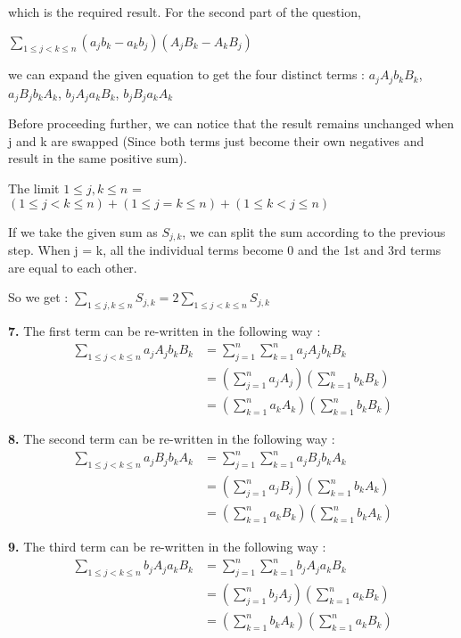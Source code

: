 \documentclass[12pt]{article}
\begin{document}
which is the required result. For the second part of the question, 

$\sum\limits_{1 \leq j < k \leq n}^{} {(a_jb_k - a_kb_j)(A_jB_k - A_kB_j)}$

we can expand the given equation to get the four distinct terms : $a_jA_jb_kB_k$, $a_jB_jb_kA_k$, $b_jA_ja_kB_k$, $b_jB_ja_kA_k$

Before proceeding further, we can notice that the result remains unchanged when j and k are swapped (Since both terms just become their own negatives and result in the same positive sum).

The limit $1 \leq j , k \leq n$ = $(1 \leq j < k \leq n) + (1 \leq j = k \leq n) + (1 \leq k < j \leq n)$

If we take the given sum as $S_{j,k}$, we can split the sum according to the previous step. When j = k, all the individual terms become 0 and the 1st and 3rd terms are equal to each other.

So we get : $\sum\limits_{1 \leq j,k \leq n}^{} S_{j,k} = 2 \sum\limits_{1 \leq j < k \leq n}^{} S_{j,k}$

{\bf 7. }The first term can be re-written in the following way :
\begin{equation}\label{eq2}
  \begin{split}
     \sum\limits_{1 \leq j < k \leq n}^{} a_jA_jb_kB_k & = \sum\limits_{j=1}^{n}\sum\limits_{k=1}^{n} {a_jA_jb_kB_k} \\
     & = (\sum\limits_{j=1}^{n}{a_jA_j}) (\sum\limits_{k=1}^{n} {b_kB_k})\\
     & = (\sum\limits_{k=1}^{n}{a_kA_k}) (\sum\limits_{k=1}^{n} {b_kB_k})
  \end{split}
\end{equation}

{\bf 8. }The second term can be re-written in the following way :
\begin{equation}\label{eq2}
  \begin{split}
     \sum\limits_{1 \leq j < k \leq n}^{} a_jB_jb_kA_k & = \sum\limits_{j=1}^{n}\sum\limits_{k=1}^{n} {a_jB_jb_kA_k} \\
     & = (\sum\limits_{j=1}^{n}{a_jB_j}) (\sum\limits_{k=1}^{n} {b_kA_k})\\
     & = (\sum\limits_{k=1}^{n}{a_kB_k}) (\sum\limits_{k=1}^{n} {b_kA_k})
  \end{split}
\end{equation}

{\bf 9. }The third term can be re-written in the following way :
\begin{equation}\label{eq2}
  \begin{split}
     \sum\limits_{1 \leq j < k \leq n}^{} b_jA_ja_kB_k & = \sum\limits_{j=1}^{n}\sum\limits_{k=1}^{n} {b_jA_ja_kB_k} \\
     & = (\sum\limits_{j=1}^{n}{b_jA_j}) (\sum\limits_{k=1}^{n} {a_kB_k})\\
     & = (\sum\limits_{k=1}^{n}{b_kA_k}) (\sum\limits_{k=1}^{n} {a_kB_k})
  \end{split}
\end{equation}
\end{document}
